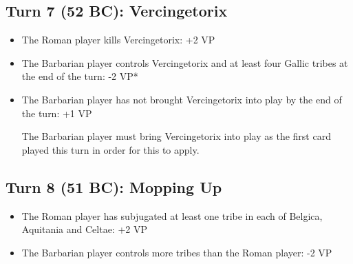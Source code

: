 \subsection{Turn 7 (52 BC): Vercingetorix}
\begin{itemize}
  \setlength\itemsep{0em}
  \item The Roman player kills Vercingetorix: +2 VP
  \item The Barbarian player controls Vercingetorix and at least four Gallic tribes at the end of the turn: -2 VP*
  \item The Barbarian player has not brought Vercingetorix into play by the end of the turn: +1 VP
  
The Barbarian player must bring Vercingetorix into play as the first card played this turn in order for this to apply.
\end{itemize}

\subsection{Turn 8 (51 BC): Mopping Up}
\begin{itemize}
  \setlength\itemsep{0em}
  \item The Roman player has subjugated at least one tribe in each of Belgica, Aquitania and Celtae: +2 VP
  \item The Barbarian player controls more tribes than the Roman player: -2 VP
\end{itemize}